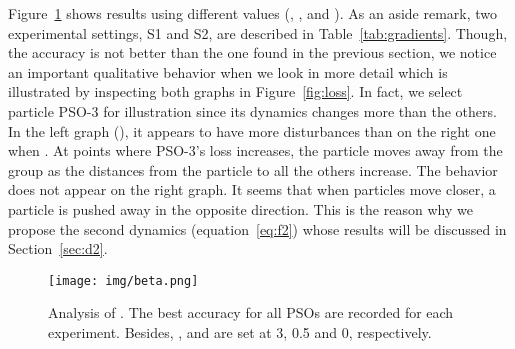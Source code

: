 \documentclass{ieeeaccess}
\begin{document}
Figure~\ref{fig:beta} shows results using different  values (, ,  and ). As an aside remark, two experimental settings,  S1 and S2, are described in Table~\ref{tab:gradients}. Though, the accuracy is not better than the one found in the previous section, we notice an important qualitative behavior when we look in more detail which is illustrated by inspecting  both graphs in Figure~\ref{fig:loss}. In fact, we select particle PSO-3 for illustration since its dynamics changes more than the others. In the left graph (), it appears to have more disturbances than on the right one when . At points where PSO-3's loss increases, the particle moves away from the group as the distances from the particle to all the others increase. The behavior does not appear on the right graph. It seems that when particles move closer, a particle is pushed away in the opposite direction. This is the reason why we propose the second dynamics (equation~\eqref{eq:f2}) whose results will be discussed in Section~\ref{sec:d2}.
\begin{table}
\centering
\caption{Settings weight }
\label{tab:gradients}
\end{table} \begin{figure}[htb!]
\begin{center}
\texttt{[image: img/beta.png]}
\caption{Analysis of . The best accuracy for all PSOs are recorded for each experiment. Besides, ,  and  are set at 3, 0.5 and 0, respectively.}
\label{fig:beta}
\end{center}
\end{figure}
\end{document}
